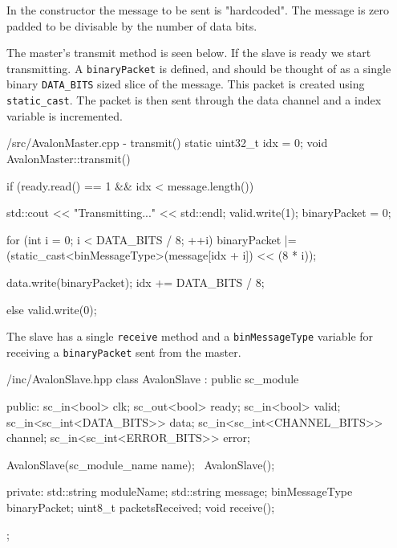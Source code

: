 \documentclass[../main.tex]{subfiles}
\begin{document}
In the constructor the message to be sent is "hardcoded". The message is zero padded to be divisable by the number of data bits.


The master's transmit method is seen below. If the slave is ready we start transmitting. A \texttt{binaryPacket} is defined, and should be thought of as a single binary \texttt{DATA\_BITS} sized slice of the message. This packet is created using \texttt{static\_cast}. The packet is then sent through the data channel and a index variable is incremented.

\newpage

\begin{myminted}{/src/AvalonMaster.cpp - transmit()}
static uint32_t idx = 0;
void AvalonMaster::transmit() {
    if (ready.read() == 1 && idx < message.length()) {
        std::cout << "Transmitting..." << std::endl;
        valid.write(1);
        binaryPacket = 0;

        for (int i = 0; i < DATA_BITS / 8; ++i) {
            binaryPacket |= (static_cast<binMessageType>(message[idx + i]) << (8 * i));
        }

        data.write(binaryPacket);
        idx += DATA_BITS / 8;
    }

    else {
        valid.write(0);
    }
}
\end{myminted}

The slave has a single \texttt{receive} method and a \texttt{binMessageType} variable for receiving a \texttt{binaryPacket} sent from the master.

\begin{myminted}{/inc/AvalonSlave.hpp}
class AvalonSlave : public sc_module {
public:
    sc_in<bool>                 clk;
    sc_out<bool>                ready;
    sc_in<bool>                 valid;
    sc_in<sc_int<DATA_BITS>>    data;
    sc_in<sc_int<CHANNEL_BITS>> channel;
    sc_in<sc_int<ERROR_BITS>>   error;

    AvalonSlave(sc_module_name name);
    ~AvalonSlave();

private:
    std::string moduleName;
    std::string message;
    binMessageType binaryPacket;
    uint8_t packetsReceived;
    void receive();
};
\end{myminted}
\end{document}
